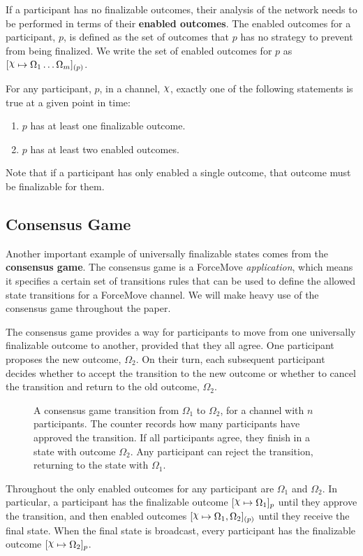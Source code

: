 If a participant has no finalizable outcomes, their analysis of the network needs to be performed
in terms of their \textbf{enabled outcomes}.
The enabled outcomes for a participant, $p$, is defined as the set of outcomes that $p$ has
no strategy to prevent from being finalized.
We write the set of enabled outcomes for $p$ as $\finalizable{\rchi}{\Omega_1 \dots \Omega_m}{(p)}$.

For any participant, $p$, in a channel, $\rchi$, exactly one of the following statements is
true at a given point in time:
\begin{enumerate}
  \item $p$ has at least one finalizable outcome.
  \item $p$ has at least two enabled outcomes.
\end{enumerate}
Note that if a participant has only enabled a single outcome, that outcome must be finalizable for them.

\subsection{Consensus Game}

Another important example of universally finalizable states comes from the \textbf{consensus game}.
The consensus game is a ForceMove \textit{application}, which means it specifies a certain
set of transitions rules that can be used to define the allowed state transitions for a ForceMove channel.
We will make heavy use of the consensus game throughout the paper.

The consensus game provides a way for participants to move from one universally finalizable outcome to another, provided that they all agree.
One participant proposes the new outcome, $\Omega_2$.
On their turn, each subsequent participant decides whether to accept the transition to the new outcome or whether to cancel the transition and return to the old outcome, $\Omega_2$.
\begin{figure}[h]\centering
  \makebox[\textwidth][c]{}
  \caption{
    A consensus game transition from $\Omega_1$ to $\Omega_2$, for a channel with $n$ participants.
    The counter records how many participants have approved the transition.
    If all participants agree, they finish in a state with outcome $\Omega_2$.
    Any participant can reject the transition, returning to the state with $\Omega_1$.
  }
\end{figure}

Throughout the only enabled outcomes for any participant are $\Omega_1$ and $\Omega_2$.
In particular, a participant has the finalizable outcome $\finalizable{\rchi}{\Omega_1}{p}$ until they approve the transition, and then enabled outcomes $\finalizable{\rchi}{\Omega_1, \Omega_2}{(p)}$ until they receive the final state.
When the final state is broadcast, every participant has the finalizable outcome $\finalizable{\rchi}{\Omega_2}{p}$.

